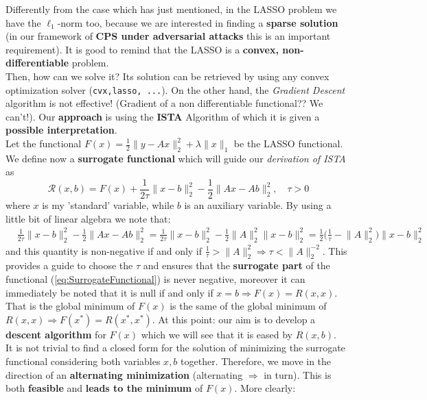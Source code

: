 Differently from the case which has just mentioned, in the LASSO problem we have the {$\ell_1$-norm} too, because we are interested in finding a \textbf{sparse solution} (in our framework of \textbf{CPS under adversarial attacks} this is an important requirement). It is good to remind that the LASSO is a \textbf{convex, non-differentiable} problem. \\
Then, how can we solve it? Its solution can be retrieved by using any convex optimization solver (\texttt{cvx,lasso, ...}). On the other hand, the \textit{Gradient Descent} algorithm is not effective! (Gradient of a non differentiable functional?? We can't!). Our \textbf{approach} is using the \textbf{ISTA} Algorithm of which it is given a \textbf{possible interpretation}. \\

Let the functional $F(x)=\frac{1}{2}\lVert y-Ax \rVert_{2}^{2}+\lambda\lVert x \rVert_1$ be the LASSO functional. We define now a \textbf{surrogate functional} which will guide our \textit{derivation of ISTA} as 
\begin{equation}    \label{eq:SurrogateFunctional}
    \mathcal{R}(x,b)=F(x)+\frac{1}{2\tau}\lVert x-b \rVert_2^2 -\frac{1}{2} \lVert Ax-Ab \rVert_2^2,
    \quad \tau > 0
\end{equation}
where $x$ is my 'standard' variable, while $b$ is an auxiliary variable. By using a little bit of linear algebra we note that:  
\begin{align*}
    &\frac{1}{2\tau}\lVert x-b \rVert_2^2 -\frac{1}{2} \lVert Ax-Ab \rVert_2^2 =
    \frac{1}{2\tau}\lVert x-b \rVert_2^2-\frac{1}{2} \lVert A \rVert_2^2 \lVert x-b \rVert_2^2=
    \frac{1}{2}  \bigg( \frac{1}{\tau} - \lVert A \rVert_2^2 \bigg) \lVert x-b \rVert_2^2
\end{align*}
and this quantity is non-negative if and only if $\frac{1}{\tau} > \lVert A \rVert_2^2 \Rightarrow \tau < \lVert A \rVert_2^{-2}$. This provides a guide to choose the $\tau$  and ensures that the \textbf{surrogate part} of the functional (\ref{eq:SurrogateFunctional}) is never negative, moreover it can immediately be noted that it is null if and only if $x=b \Rightarrow F(x)=R(x,x)$. That is the global minimum of $F(x)$ is the same of the global minimum of $R(x, x) \Rightarrow F(x^*)=R(x^*, x^*)$. At this point: our aim is to develop a \textbf{descent algorithm} for $F(x)$ which we will see that it is eased by $R(x, b)$.\\

It is not trivial to find a closed form for the solution of minimizing the surrogate functional considering both variables $x, b$ together. Therefore, we move in the direction of an \textbf{alternating minimization} (alternating $\Rightarrow$ in turn). This is both \textbf{feasible} and \textbf{leads to the minimum} of $F(x)$. More clearly:

